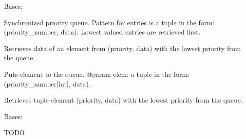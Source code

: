 \documentclass[letterpaper,10pt,english]{sphinxmanual}
\begin{document}
\begin{fulllineitems}
\label{ref-manual/XrdTest:XrdTest.SocketUtils.PriorityBlockingQueue}
Bases: 

Synchronized priority queue.
Pattern for entries is a tuple in the form: (priority\_number, data).
Lowest valued entries are retrieved first.

\begin{fulllineitems}
\label{ref-manual/XrdTest:XrdTest.SocketUtils.PriorityBlockingQueue.get}
Retrieves data of an element from (priority, data)
with the lowest priority from the queue.

\end{fulllineitems}


\begin{fulllineitems}
\label{ref-manual/XrdTest:XrdTest.SocketUtils.PriorityBlockingQueue.put}
Puts element to the queue.
@param elem: a tuple in the form: (priority\_number{[}int{]}, data).

\end{fulllineitems}


\begin{fulllineitems}
\label{ref-manual/XrdTest:XrdTest.SocketUtils.PriorityBlockingQueue.rawGet}
Retrieves tuple element (priority, data)
with the lowest priority from the queue.

\end{fulllineitems}


\end{fulllineitems}


\begin{fulllineitems}
\label{ref-manual/XrdTest:XrdTest.SocketUtils.SocketDisconnectedError}
Bases: 

TODO

\end{fulllineitems}
\end{document}
